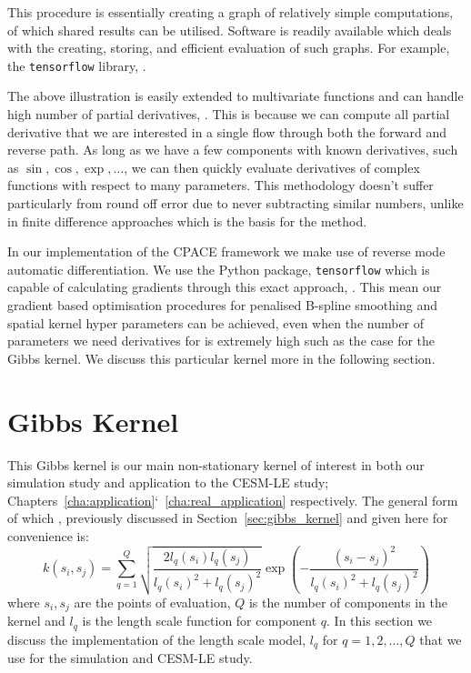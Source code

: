 This procedure is essentially creating a graph of relatively simple computations, of which shared results can be utilised.
Software is readily available which deals with the creating, storing, and efficient evaluation of such graphs.
For example, the \verb*|tensorflow| library, \citep{abadi_tensorflow_2016}.

The above illustration is easily extended to multivariate functions and can handle high number of partial derivatives, \citep{neidinger_introduction_2010}.
This is because we can compute all partial derivative that we are interested in a single flow through both the forward and reverse path.
As long as we have a few components with known derivatives, such as $\sin, \cos, \exp, \dots$, we can then quickly evaluate derivatives of complex functions with respect to many parameters.
This methodology doesn't suffer particularly from round off error due to never subtracting similar numbers, unlike in finite difference approaches which is the basis for the method.

In our implementation of the CPACE framework we make use of reverse mode automatic differentiation.
We use the Python package, \verb*|tensorflow| which is capable of calculating gradients through this exact approach, \citep{abadi_tensorflow_2016}. 
This mean our gradient based optimisation procedures for penalised B-spline smoothing and spatial kernel hyper parameters can be achieved, even when the number of parameters we need derivatives for is extremely high such as the case for the Gibbs kernel.
We discuss this particular kernel more in the following section.


\section{Gibbs Kernel \label{sec:gibbs_kernel}}
This Gibbs kernel is our main non-stationary kernel of interest in both our simulation study and application to the CESM-LE study; Chapters~\ref{cha:application}`~\ref{cha:real_application} respectively.
The general form of which , previously discussed in Section~\ref{sec:gibbs_kernel} and given here for convenience is: 
\begin{equation}
	k\left(s_{i}, s_{j}\right) = \sum_{q=1}^{Q} \sqrt{\frac{2l_q(s_i)l_q(s_j)}{l_q(s_i)^2 + l_q(s_j)^2}} \exp \left(-\frac{\left(s_i - s_j\right)^2}{l_q(s_i)^2 + l_q(s_j)^2}\right)
\end{equation}
where $s_i, s_j$ are the points of evaluation, $Q$ is the number of components in the kernel and $l_q$ is the length scale  function for component $q$.
In this section we discuss the implementation of the length scale model, $l_q$ for $q=1,2,\dots,Q$ that we use for the simulation and CESM-LE study.

